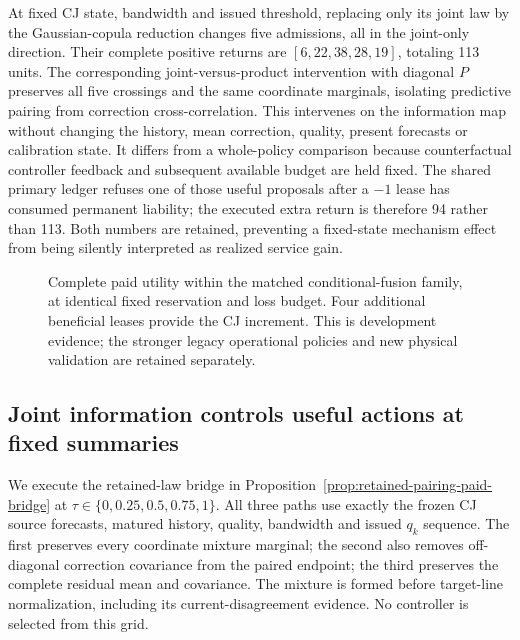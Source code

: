 \documentclass[10pt]{article}
\begin{document}
At fixed CJ state, bandwidth and issued threshold, replacing only its
joint law by the Gaussian-copula reduction changes five admissions,
all in the joint-only direction. Their complete positive returns are
$[6,22,38,28,19]$, totaling 113 units. The corresponding joint-versus-product
intervention with diagonal $P$ preserves all five crossings and the same
coordinate marginals, isolating predictive pairing from correction
cross-correlation. This intervenes on the information map without changing the
history, mean correction, quality, present forecasts or calibration state.
It differs from a whole-policy comparison because counterfactual controller
feedback and subsequent available budget are held fixed. The shared
primary ledger refuses one of those useful proposals after a $-1$ lease
has consumed permanent liability; the executed extra return is therefore
94 rather than 113. Both numbers are retained, preventing a fixed-state
mechanism effect from being silently interpreted as realized service gain.

\begin{figure}[t]
\centering
{}
\caption{Complete paid utility within the matched conditional-fusion
family, at identical fixed reservation and loss budget. Four additional
beneficial leases provide the CJ increment. This is development evidence;
the stronger legacy operational policies and new physical validation
are retained separately.}
\label{fig:conditional-rss-return}
\end{figure}

\subsection{Joint information controls useful actions at fixed summaries}
\label{sec:rss-pairing-bridge}
We execute the retained-law bridge in
Proposition~\ref{prop:retained-pairing-paid-bridge} at
$\tau\in\{0,0.25,0.5,0.75,1\}$. All three paths use exactly the
frozen CJ source forecasts, matured history, quality, bandwidth and issued
$q_k$ sequence. The first preserves every coordinate mixture marginal;
the second also removes off-diagonal correction covariance from the paired
endpoint; the third preserves the complete residual mean and covariance.
The mixture is formed before target-line normalization, including its
current-disagreement evidence. No controller is selected from this grid.
\end{document}
